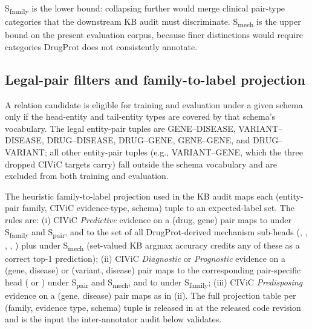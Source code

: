 S\textsubscript{family} is the lower bound: collapsing further would
merge clinical pair-type categories that the downstream KB audit must
discriminate. S\textsubscript{mech} is the upper bound on the present
evaluation corpus, because finer distinctions would require categories
DrugProt does not consistently annotate.

\subsection{Legal-pair filters and family-to-label projection}
\label{supp:schemas-filters}

A relation candidate is eligible for training and evaluation under a
given schema only if the head-entity and tail-entity types are
covered by that schema's vocabulary. The legal entity-pair tuples
are GENE--DISEASE, VARIANT--DISEASE, DRUG--DISEASE, DRUG--GENE,
GENE--GENE, and DRUG--VARIANT; all other entity-pair tuples
(e.g., VARIANT--GENE, which the three dropped CIViC targets carry)
fall outside the schema vocabulary and are excluded from both
training and evaluation.

The heuristic family-to-label projection used in the KB audit maps
each (entity-pair family, CIViC evidence-type, schema) tuple to an
expected-label set. The rules are: (i) CIViC \emph{Predictive}
evidence on a (drug, gene) pair maps to
 under S\textsubscript{family} and
S\textsubscript{pair}, and to the set of all DrugProt-derived
mechanism sub-heads (, ,
, ,
) plus  under
S\textsubscript{mech} (set-valued KB argmax accuracy credits any of
these as a correct top-1 prediction); (ii) CIViC \emph{Diagnostic}
or \emph{Prognostic} evidence on a (gene, disease) or (variant,
disease) pair maps to the corresponding pair-specific head
( or ) under
S\textsubscript{pair} and S\textsubscript{mech}, and to
 under S\textsubscript{family};
(iii) CIViC \emph{Predisposing} evidence on a (gene, disease) pair
maps as in (ii). The full projection table per (family, evidence
type, schema) tuple is released in
at the released code revision and is the input the inter-annotator
audit below validates.

